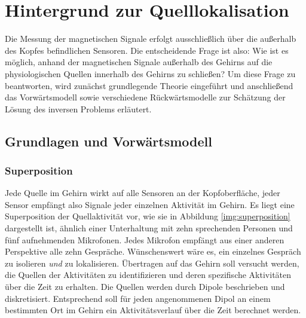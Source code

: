 \documentclass[doc,a4paper,12pt]{apa6}
\begin{document}

\newpage
\section{Hintergrund zur Quelllokalisation}
\label{sec:hinter}

Die Messung der magnetischen Signale erfolgt ausschließlich über die außerhalb des Kopfes befindlichen Sensoren. Die entscheidende Frage ist also: Wie ist es möglich, anhand der magnetischen Signale außerhalb des Gehirns auf die physiologischen Quellen innerhalb des Gehirns zu schließen? Um diese Frage zu beantworten, wird zunächst grundlegende Theorie eingeführt und anschließend das Vorwärtsmodell sowie verschiedene Rückwärtsmodelle zur Schätzung der Lösung des inversen Problems erläutert.


\subsection{Grundlagen und Vorwärtsmodell}

\subsubsection{Superposition}

Jede Quelle im Gehirn wirkt auf alle Sensoren an der Kopfoberfläche, jeder Sensor empfängt also Signale jeder einzelnen Aktivität im Gehirn. Es liegt eine Superposition der Quellaktivität vor, wie sie in Abbildung \ref{img:superposition} dargestellt ist, ähnlich einer Unterhaltung mit zehn sprechenden Personen und fünf aufnehmenden Mikrofonen. Jedes Mikrofon empfängt aus einer anderen Perspektive alle zehn Gespräche. Wünschenswert wäre es, ein einzelnes Gespräch zu isolieren \emph{und} zu lokalisieren. Übertragen auf das Gehirn soll versucht werden, die Quellen der Aktivitäten zu identifizieren und deren spezifische Aktivitäten über die Zeit zu erhalten. Die Quellen werden durch Dipole beschrieben und diskretisiert. Entsprechend soll für jeden angenommenen Dipol an einem bestimmten Ort im Gehirn ein Aktivitätsverlauf über die Zeit berechnet werden.
\end{document}
